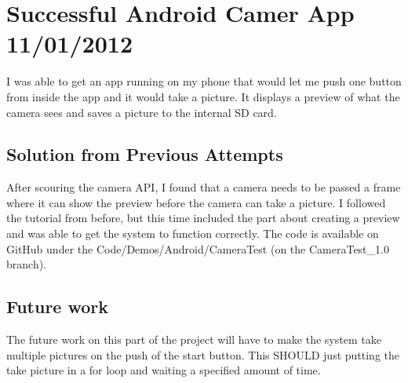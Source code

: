 \documentclass[]{article}
\begin{document}
	\tableofcontents
	\newpage
	\setcounter{page}{1}
	\thispagestyle{empty}
	
	
	\setlength{\parindent}{0pt}
	\setlength{\parskip}{6pt}
	
	\section{Successful Android Camer App 11/01/2012}
		I was able to get an app running on my phone that would let me push one button from inside the app and it would take a picture. It displays a preview of what the camera sees and saves a picture to the internal SD card. 
		
		\subsection{Solution from Previous Attempts}
			After scouring the camera API, I found that a camera needs to be passed a frame where it can show the preview before the camera can take a picture. I followed the tutorial from before, but this time included the part about creating a preview and was able to get the system to function correctly. The code is available on  GitHub under the Code/Demos/Android/CameraTest (on the CameraTest\_1.0 branch). 
			
		\subsection{Future work}
			The future work on this part of the project will have to make the system take multiple pictures on the push of the start button. This SHOULD just putting the take picture in a for loop and waiting a specified amount of time. 
			
	
\end{document}
